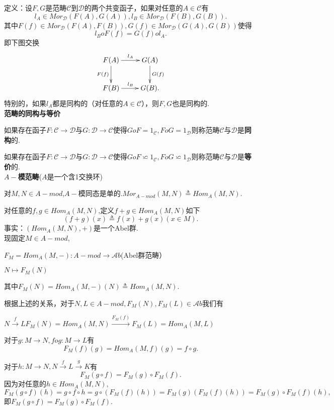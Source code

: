 \documentclass[UTF8]{article}
\begin{document}
定义：设$F,G$是范畴$\mathscr{C}$到$\mathscr{D}$的两个共变函子，如果对任意的$A\in \mathscr{C}$有
$$l_{A}\in Mor_{\mathscr{D}}(F(A),G(A)),l_{B}\in Mor_{\mathscr{D}}(F(B),G(B)).$$
其中$F(f)\in Mor_{\mathscr{D}}(F(A),F(B)),G(f)\in Mor_{\mathscr{D}}(G(A),G(B))$使得
$$l_{B}oF(f)=G(f)ol_{A}.$$
即下图交换
$$
\xymatrix{
	F(A)\ar[r]^{l_{A}}\ar[d]_{F(f)}&G(A)\ar[d]^{G(f)}\\
	F(B)\ar[r]^{l_{B}}&G(B).
}
$$
特别的，如果$l_{A}$都是同构的（对任意的$A\in \mathscr{C}$），则$F,G$也是同构的.\\
\textbf{范畴的同构与等价}

如果存在函子$F:\mathscr{C}\longrightarrow \mathscr{D}$与$G:\mathscr{D}\longrightarrow \mathscr{C}$使得$GoF=1_{\mathscr{C}},FoG=1_{\mathscr{D}}$则称范畴$\mathscr{C}$与$\mathscr{D}$是\textbf{同构}的.


如果存在函子$F:\mathscr{C}\longrightarrow \mathscr{D}$与$G:\mathscr{D}\longrightarrow \mathscr{C}$使得$GoF\backsimeq 1_{\mathscr{C}},FoG\backsimeq 1_{\mathscr{D}}$则称范畴$\mathscr{C}$与$\mathscr{D}$是\textbf{等价}的.\\
\textbf{$A-$模范畴}($A$是一个含1交换环)

对$M,N\in A-mod$,$A-$模同态是单的.$Mor_{A-mod}(M,N)\triangleq Hom_{A}(M,N).$

对任意的$f,g\in Hom_{A}(M,N)$,定义$f+g\in Hom_{A}(M,N)$如下
$$(f+g)(x)\triangleq f(x)+g(x)(x\in M).$$
事实：$(Hom_{A}(M,N),+)$是一个Abel群.\\


现固定$M\in A-mod$,

$F_{M}=Hom_{A}(M,-):$\quad$A-mod\longrightarrow \mathscr{A}b$(Abel群范畴）

\qquad\qquad\qquad\qquad\qquad\qquad\qquad\qquad$N\longmapsto F_{M}(N)$

其中$ F_{M}(N)=Hom_{A}(M,-)(N)\triangleq Hom_{A}(M,N).$

根据上述的关系，对于$N,L\in A-mod,F_{M}(N),F_{M}(L)\in \mathscr{A}b$我们有

\qquad$N\xrightarrow{f}L$\qquad$F_{M}(N)=Hom_{A}(M,N)\xrightarrow{F_{M}(f)}F_{M}(L)=Hom_{A}(M,L)$

对于$g:M\longrightarrow N,fog:M\longrightarrow L$有
$$F_{M}(f)(g)=Hom_{A}(M,f)(g)=f\circ g.$$

对于$h:M\longrightarrow N,N\xrightarrow{f}L\xrightarrow{g}K$有
$$F_{M}(g\circ f)=F_{M}(g)\circ F_{M}(f).$$
因为对任意的$h\in Hom_{A}(M,N),$
$$F_{M}(g\circ f)(h)=g\circ f\circ h=g\circ(F_{M}(f)(h))=F_{M}(g)(F_{M}(f)(h))=F_{M}(g)\circ F_{M}(f)(h),$$
即$F_{M}(g\circ f)=F_{M}(g)\circ F_{M}(f).$\\
\end{document}
